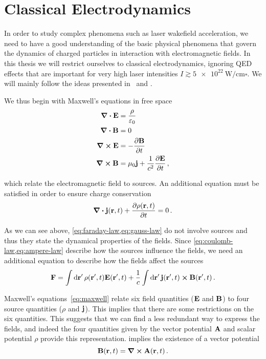 \documentclass[12pt, class=report, crop=false]{standalone}
\begin{document}
\chapter{Classical Electrodynamics}%
\label{chap:classical-electrodynamics}

In order to study complex phenomena such as laser wakefield acceleration,
we need to have a good understanding of the basic physical phenomena
that govern the dynamics of charged particles in interaction
with electromagnetic fields. In this thesis we will restrict ourselves to
classical electrodynamics, ignoring QED effects that are important
for very high laser intensities \(I \gtrsim \SI{5e22}{\watt/\centi\metre\square}\).
We will mainly follow the ideas presented in~\textcite{jackson_classicalelectrodynamics_1999}
and \textcite[Chapter 2]{eisenberg_nucleartheory_1978}.

We thus begin with Maxwell's equations in free space
\begin{subequations}%
  \label{eq:maxwell}
  \begin{align}
    \div{\vb{E}} & = \frac{\rho}{\varepsilon_0} \label{eq:coulomb-law} \\
    \div{\vb{B}} & = 0 \label{eq:gauss-law} \\
    \curl{\vb{E}} & = - \pdv{\vb{B}}{t} \label{eq:faraday-law} \\
    \curl{\vb{B}} & = \mu_0 \vb{j} + \frac{1}{c^2} \pdv{\vb{E}}{t} \,, \label{eq:ampere-law}
  \end{align}
\end{subequations}

which relate the electromagnetic field to sources. An additional
equation must be satisfied in order to ensure charge conservation
\begin{equation}
  \label{eq:continuity-equation}
  \div{\vb{j}(\vb{r}, t)} + \pdv{\rho(\vb{r}, t)}{t} = 0 \,.
\end{equation}

As we can see above, \cref{eq:faraday-law,eq:gauss-law}
do not involve sources and thus they state the dynamical properties of the fields.
Since \cref{eq:coulomb-law,eq:ampere-law} describe how
the sources influence the fields, we need an additional equation to describe how
the fields affect the sources
\[
  \vb{F} = \int \dd{\vb{r}'} \rho(\vb{r}', t) \vb{E}(\vb{r}', t) +
           \frac{1}{c} \int \dd{\vb{r}'} \vb{j}(\vb{r}', t) \cross \vb{B}(\vb{r}', t)\,.
\]

Maxwell's equations~\eqref{eq:maxwell} relate six field quantities (\(\vb{E}\) and \(\vb{B}\))
to four source quantities (\(\rho\) and \(\vb{j}\)). This implies that there are some
restrictions on the six quantities. This suggests that we can find a less redundant
way to express the fields, and indeed the four quantities given by the
vector potential \(\vb{A}\) and scalar potential \(\rho\) provide this representation.
 implies the existence of a vector potential
\begin{equation}
  \label{eq:vector-potential}
  \vb{B}(\vb{r}, t) = \curl{\vb{A}(\vb{r}, t)}\,.
\end{equation}
\end{document}
